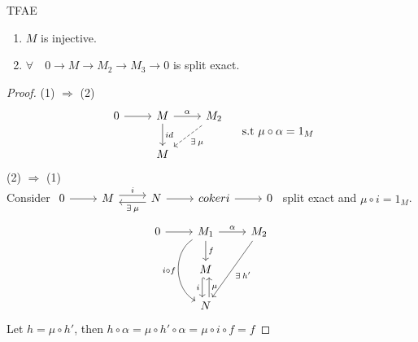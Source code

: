 \begin{prop}
  TFAE
  \begin{enumerate}
    \item $M$ is injective.
    \item $\forall \quad 0 \to M \to M_2 \to M_3 \to 0$ is split exact.
  \end{enumerate}
  \begin{proof}
    (1) $\Rightarrow$ (2) \\
    $$
    \begin{tikzcd}
      0 \ar[r] & M \ar[r, "\alpha"] \ar[d, "id"] & M_2 \ar[dl, "\exists
      \mu", dashed] \\
               & M
    \end{tikzcd}
    \quad \text{ s.t }\mu \circ \alpha = 1_M
    $$
    (2) $\Rightarrow$ (1) \\
    Consider
    $
    \begin{tikzcd}
    0 \ar[r] & M \ar[r, "i", yshift=0.7ex] &  N \ar[r] \ar[l, "\exists \mu", 
      yshift=-0.7ex] & coker i \ar[r]& 0
    \end{tikzcd}
    $
    split exact and $\mu \circ i = 1_M$.
    $$
    \begin{tikzcd}
      0 \ar[r] & M_1 \ar[r, "\alpha"] \ar[d , "f"] \ar[dd, "i 
      \circ f" swap, bend right = 60] & M_2 \ar[ddl, "\exists h'"]\\
               & M \ar[d, xshift=-0.7ex, "i" swap , hook] \\
               & N \ar[u, xshift=0.7ex, "\mu" swap]
    \end{tikzcd}
    $$
    Let $h = \mu \circ h'$, then $h \circ \alpha = \mu \circ h' 
    \circ \alpha = \mu \circ i \circ f = f$
  \end{proof}
\end{prop}

